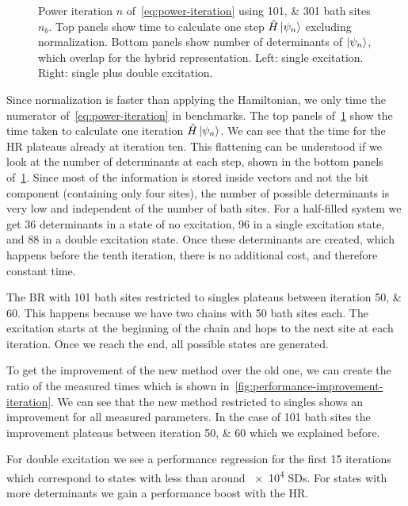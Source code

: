 \begin{figure}[htb!]
    \centering
    
    \caption{
        Power iteration $n$ of~\cref{eq:power-iteration}
        using \numlist{101; 301} bath sites $n_b$.
        Top panels show time to calculate one step $\hat{H} \ket{\psi_n}$
        excluding normalization.
        Bottom panels show number of determinants of $\ket{\psi_n}$,
        which overlap for the hybrid representation.
        Left: single excitation.
        Right: single plus double excitation.
    }
    \label{fig:wave-function-iteration}
\end{figure}

Since normalization is faster than applying the Hamiltonian,
we only time the numerator of~\cref{eq:power-iteration} in benchmarks.
The top panels of~\cref{fig:wave-function-iteration} show the time taken
to calculate one iteration $\hat{H}\ket{\psi_n}$.
We can see that the time for the HR plateaus already at iteration ten.
This flattening can be understood
if we look at the number of determinants at each step,
shown in the bottom panels of~\cref{fig:wave-function-iteration}.
Since most of the information is stored inside vectors and not the
bit component (containing only four sites),
the number of possible determinants is very low
and independent of the number of bath sites.
For a half-filled system we get
36 determinants in a state of no excitation,
96 in a single excitation state,
and 88 in a double excitation state.
Once these determinants are created,
which happens before the tenth iteration,
there is no additional cost,
and therefore constant time.

The BR with 101 bath sites
restricted to singles
plateaus between iteration \numlist{50; 60}.
This happens because we have two chains with 50 bath sites each.
The excitation starts at the beginning of the chain and hops to the next
site at each iteration.
Once we reach the end,
all possible states are generated.

To get the improvement of the new method over the old one,
we can create the ratio of the measured times
which is shown in~\cref{fig:performance-improvement-iteration}.
We can see that the new method restricted to singles
shows an improvement for all measured parameters.
In the case of 101 bath sites the improvement plateaus
between iteration \numlist{50; 60} which we explained before.

For double excitation we see a performance regression for
the first 15 iterations
which correspond to states with less than around \num{e4} SDs.
For states with more determinants
we gain a performance boost with the HR.

